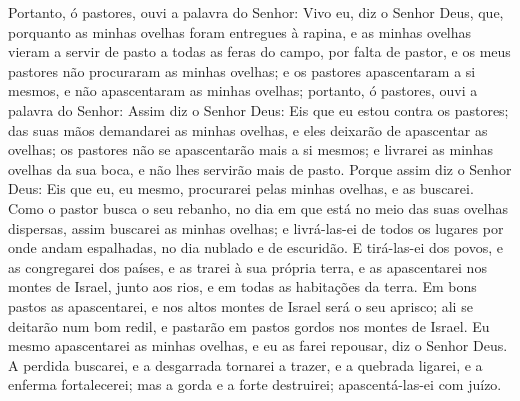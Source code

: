 Portanto, ó pastores, ouvi a palavra do Senhor: Vivo eu, diz o
Senhor Deus, que, porquanto as minhas ovelhas foram entregues à
rapina, e as minhas ovelhas vieram a servir de pasto a todas as
feras do campo, por falta de pastor, e os meus pastores não
procuraram as minhas ovelhas; e os pastores apascentaram a si
mesmos, e não apascentaram as minhas ovelhas; portanto, ó
pastores, ouvi a palavra do Senhor: Assim diz o Senhor Deus:
Eis que eu estou contra os pastores; das suas mãos demandarei as
minhas ovelhas, e eles deixarão de apascentar as ovelhas; os
pastores não se apascentarão mais a si mesmos; e livrarei as minhas
ovelhas da sua boca, e não lhes servirão mais de pasto.
Porque assim diz o Senhor Deus: Eis que eu, eu mesmo,
procurarei pelas minhas ovelhas, e as buscarei. Como o pastor
busca o seu rebanho, no dia em que está no meio das suas ovelhas
dispersas, assim buscarei as minhas ovelhas; e livrá-las-ei de todos
os lugares por onde andam espalhadas, no dia nublado e de escuridão.
E tirá-las-ei dos povos, e as congregarei dos países, e as
trarei à sua própria terra, e as apascentarei nos montes de Israel,
junto aos rios, e em todas as habitações da terra. Em bons
pastos as apascentarei, e nos altos montes de Israel será o seu
aprisco; ali se deitarão num bom redil, e pastarão em pastos gordos
nos montes de Israel. Eu mesmo apascentarei as minhas
ovelhas, e eu as farei repousar, diz o Senhor Deus. A perdida
buscarei, e a desgarrada tornarei a trazer, e a quebrada ligarei, e
a enferma fortalecerei; mas a gorda e a forte destruirei;
apascentá-las-ei com juízo.

